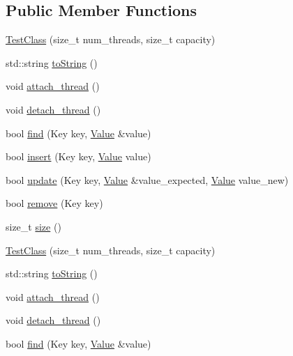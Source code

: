 \subsection*{Public Member Functions}
\begin{DoxyCompactItemize}
\item 
\hyperlink{class_test_class_ab3dbc7a67da46dda1125f7dee533aca2}{Test\+Class} (size\+\_\+t num\+\_\+threads, size\+\_\+t capacity)
\item 
std\+::string \hyperlink{class_test_class_a84e73a91ede625887472a307235d6de5}{to\+String} ()
\item 
void \hyperlink{class_test_class_a7e6bce4c39c047282ea8c1f1485a260b}{attach\+\_\+thread} ()
\item 
void \hyperlink{class_test_class_a79b3a395c8a1fac7a156228a27d829cc}{detach\+\_\+thread} ()
\item 
bool \hyperlink{class_test_class_af497b95115e81f882851b2ab843c298c}{find} (Key key, \hyperlink{hash__map_2test_object_8h_ad777bf08d8e2b01df17ba5e3c51ae11f}{Value} \&value)
\item 
bool \hyperlink{class_test_class_a0d075565ad4cccdb071bf267fe444681}{insert} (Key key, \hyperlink{hash__map_2test_object_8h_ad777bf08d8e2b01df17ba5e3c51ae11f}{Value} value)
\item 
bool \hyperlink{class_test_class_a4c33c8cac20119f9bee9b5091bc8a385}{update} (Key key, \hyperlink{hash__map_2test_object_8h_ad777bf08d8e2b01df17ba5e3c51ae11f}{Value} \&value\+\_\+expected, \hyperlink{hash__map_2test_object_8h_ad777bf08d8e2b01df17ba5e3c51ae11f}{Value} value\+\_\+new)
\item 
bool \hyperlink{class_test_class_a3a22d60709c15d419f69d29b7de92d02}{remove} (Key key)
\item 
size\+\_\+t \hyperlink{class_test_class_af2230f298ab3ef4ebf71aa7afa3fb6ca}{size} ()
\item 
\hyperlink{class_test_class_ab3dbc7a67da46dda1125f7dee533aca2}{Test\+Class} (size\+\_\+t num\+\_\+threads, size\+\_\+t capacity)
\item 
std\+::string \hyperlink{class_test_class_a84e73a91ede625887472a307235d6de5}{to\+String} ()
\item 
void \hyperlink{class_test_class_a7e6bce4c39c047282ea8c1f1485a260b}{attach\+\_\+thread} ()
\item 
void \hyperlink{class_test_class_a79b3a395c8a1fac7a156228a27d829cc}{detach\+\_\+thread} ()
\item 
bool \hyperlink{class_test_class_af497b95115e81f882851b2ab843c298c}{find} (Key key, \hyperlink{hash__map_2test_object_8h_ad777bf08d8e2b01df17ba5e3c51ae11f}{Value} \&value)

\end{DoxyCompactItemize}
